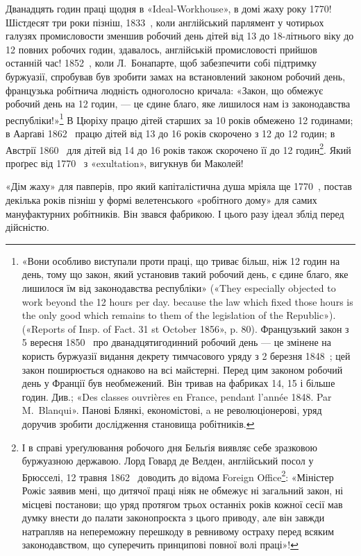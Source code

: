 Дванадцять годин праці щодня в «Ideal-Workhouse», в домі
жаху року 1770! Шістдесят три роки пізніш, 1833~, коли англійський
парлямент у чотирьох галузях промисловости зменшив
робочий день дітей від 13 до 18-літнього віку до 12 повних робочих
годин, здавалось, англійській промисловості прийшов останній
час! 1852~, коли Л.~Бонапарте, щоб забезпечити собі підтримку
буржуазії, спробував був зробити замах на встановлений
законом робочий день, французька робітнича людність одноголосно
кричала: «Закон, що обмежує робочий день на 12 годин, —
це єдине благо, яке лишилося нам із законодавства республіки!»\footnote{
«Вони особливо виступали проти праці, що триває більш, ніж
12 годин на день, тому що закон, який установив такий робочий день, є
єдине благо, яке лишилося їм від законодавства республіки» («They especially
objected to work beyond the 12 hours per day. because the law which
fixed those hours is the only good which remains to them of the legislation
of the Republic»). («Reports of Insp. of Fact. 31 st October 1856»,
p. 80). Французький закон з 5 вересня 1850~ про дванадцятигодинний
робочий день — це змінене на користь буржуазії видання декрету тимчасового
уряду з 2 березня 1848~; цей закон поширюється однаково на
всі майстерні. Перед цим законом робочий день у Франції був необмежений.
Він тривав на фабриках 14, 15 і більше годин. Див.; «Des classes
ouvrières en France, pendant l'année 1848. Par M.~Blanqui». Панові Блянкі,
економістові, a не революціонерові, уряд доручив зробити дослідження
становища робітників.
}
В Цюріху працю дітей старших за 10 років обмежено 12 годинами;
в Аарґаві 1862~ працю дітей від 13 до 16 років скорочено з 12
до 12 годин; в Австрії 1860~ для дітей від 14 до 16 років також
скорочено її до 12 годин\footnote{
І в справі уреґулювання робочого дня Бельґія виявляє себе зразковою
буржуазною державою. Лорд Говард де Велден, англійський посол
у Брюсселі, 12 травня 1862~ доводить до відома Foreign Office\footnote*{
англійського міністерства закордонних справ. \emph{Ред.}
}: «Міністер
Рожіє заявив мені, що дитячої праці ніяк не обмежує ні загальний закон,
ні місцеві постанови; що уряд протягом трьох останніх років кожної сесії
мав думку внести до палати законопроєкта з цього приводу, але він завжди
натрапляв на непереможну перешкоду в ревнивому остраху перед
всяким законодавством, що суперечить принципові повної волі праці»!
}. Який проґрес від 1770~ з «exultation», вигукнув би Маколей!

«Дім жаху» для павперів, про який капіталістична душа
мріяла ще 1770~, постав декілька років пізніш у формі велетенського
«робітного дому» для самих мануфактурних робітників.
Він звався фабрикою. І цього разу ідеал зблід перед дійсністю.


